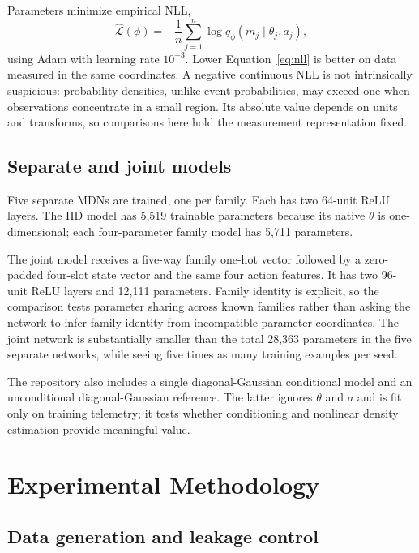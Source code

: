 \documentclass[10pt]{article}
\begin{document}
Parameters minimize empirical NLL,
\begin{equation}
 \widehat{\mathcal L}(\phi)=-\frac{1}{n}\sum_{j=1}^{n}
 \log q_\phi(m_j\mid\theta_j,a_j),
 \label{eq:nll}
\end{equation}
using Adam with learning rate $10^{-3}$. Lower Equation~\eqref{eq:nll} is better on data measured in the same coordinates. A negative continuous NLL is not intrinsically suspicious: probability densities, unlike event probabilities, may exceed one when observations concentrate in a small region. Its absolute value depends on units and transforms, so comparisons here hold the measurement representation fixed.

\subsection{Separate and joint models}

Five separate MDNs are trained, one per family. Each has two 64-unit ReLU layers. The IID model has 5,519 trainable parameters because its native $\theta$ is one-dimensional; each four-parameter family model has 5,711 parameters.

The joint model receives a five-way family one-hot vector followed by a zero-padded four-slot state vector and the same four action features. It has two 96-unit ReLU layers and 12,111 parameters. Family identity is explicit, so the comparison tests parameter sharing across known families rather than asking the network to infer family identity from incompatible parameter coordinates. The joint network is substantially smaller than the total 28,363 parameters in the five separate networks, while seeing five times as many training examples per seed.

The repository also includes a single diagonal-Gaussian conditional model and an unconditional diagonal-Gaussian reference. The latter ignores $\theta$ and $a$ and is fit only on training telemetry; it tests whether conditioning and nonlinear density estimation provide meaningful value.

\section{Experimental Methodology}

\subsection{Data generation and leakage control}
\end{document}
